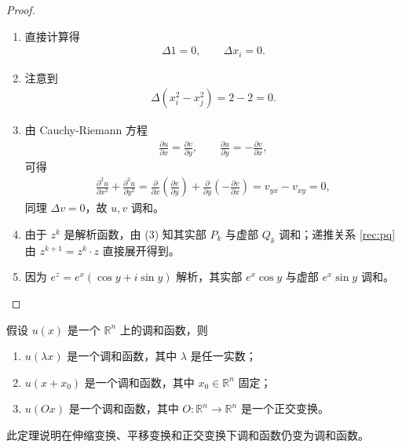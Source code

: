 \documentclass[../../main.tex]{subfiles}%
\begin{document}
\begin{proof}
\begin{enumerate}[(1)]
\item 直接计算得
\begin{align*}
\Delta 1=0,\qquad \Delta x_i=0.
\end{align*}

\item 注意到
\begin{align*}
\Delta(x_i^2-x_j^2)=2-2=0.
\end{align*}

\item 由 Cauchy-Riemann 方程
\begin{align*}
\frac{\partial u}{\partial x}=\frac{\partial v}{\partial y},\qquad 
\frac{\partial u}{\partial y}=-\frac{\partial v}{\partial x},
\end{align*}
可得
\begin{align*}
\frac{\partial^2 u}{\partial x^2}+\frac{\partial^2 u}{\partial y^2}
= \frac{\partial}{\partial x}\left(\frac{\partial v}{\partial y}\right)
+\frac{\partial}{\partial y}\left(-\frac{\partial v}{\partial x}\right)
= v_{yx}-v_{xy}=0,
\end{align*}
同理 $\Delta v=0$，故 $u,v$ 调和。

\item 由于 $z^k$ 是解析函数，由 (3) 知其实部 $P_k$ 与虚部 $Q_k$ 调和；递推关系 \eqref{rec:pq} 由 $z^{k+1}=z^k\cdot z$ 直接展开得到。

\item 因为 $e^z=e^x(\cos y+i\sin y)$ 解析，其实部 $e^x\cos y$ 与虚部 $e^x\sin y$ 调和。
\end{enumerate}
\end{proof}

\begin{theorem}
假设 $u(x)$ 是一个 $\mathbb{R}^n$ 上的调和函数，则
\begin{enumerate}[(1)]
\item $u(\lambda x)$ 是一个调和函数，其中 $\lambda$ 是任一实数；
\item $u(x+x_0)$ 是一个调和函数，其中 $x_0\in\mathbb{R}^n$ 固定；
\item $u(Ox)$ 是一个调和函数，其中 $O:\mathbb{R}^n\to\mathbb{R}^n$ 是一个正交变换。
\end{enumerate}
\end{theorem}
\begin{remark}
此定理说明在伸缩变换、平移变换和正交变换下调和函数仍变为调和函数。
\end{remark}
\end{document}
